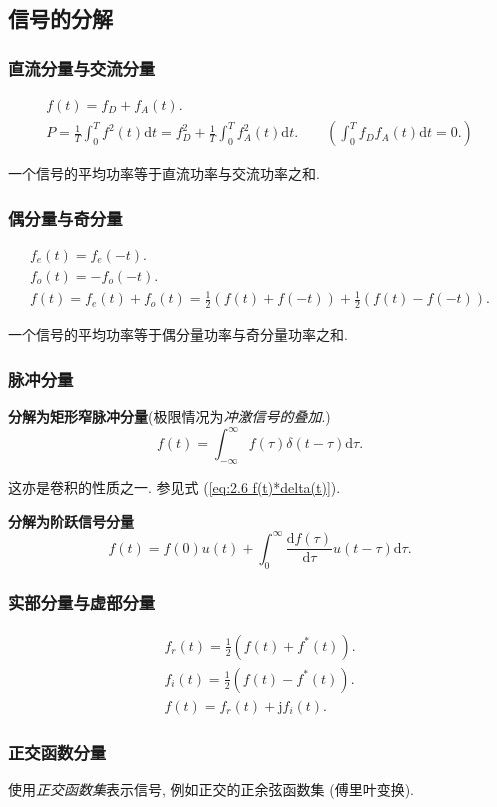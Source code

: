 \subsection{信号的分解}

\subsubsection{直流分量与交流分量}

\rmg
\begin{gather}
    f(t)=f_D+f_A(t). \\
    P=\frac{1}{T}\int_{0}^{T}f^2(t)\mathrm{d}t=f_D^2+\frac{1}{T}\int_{0}^{T}f_A^2(t)\mathrm{d}t.\qquad \left(\int_{0}^{T}f_Df_A(t)\mathrm{d}t=0.\right)
\end{gather}

一个信号的平均功率等于直流功率与交流功率之和.

\subsubsection{偶分量与奇分量}

\rmg
\begin{gather}
    f_e(t)=f_e(-t). \\
    f_o(t)=-f_o(-t). \\
    f(t)=f_e(t)+f_o(t)=\frac{1}{2}(f(t)+f(-t))+\frac{1}{2}(f(t)-f(-t)).
\end{gather}

一个信号的平均功率等于偶分量功率与奇分量功率之和.

\subsubsection{脉冲分量}

\textbf{分解为矩形窄脉冲分量}\quad (极限情况为\textit{冲激信号的叠加}.)
\begin{equation}
    f(t)=\int_{-\infty}^{\infty}f(\tau)\delta(t-\tau)\mathrm{d}\tau.
\end{equation}

这亦是卷积的性质之一. 参见式 (\ref{eq:2.6 f(t)*delta(t)}).

\textbf{分解为阶跃信号分量}
\begin{equation}
    f(t)=f(0)u(t)+\int_{0}^{\infty}\frac{\mathrm{d}f(\tau)}{\mathrm{d}\tau}u(t-\tau)\mathrm{d}\tau.
\end{equation}

\subsubsection{实部分量与虚部分量}

\rmg
\begin{gather}
    f_r(t)=\frac{1}{2}(f(t)+f^*(t)). \\
    f_i(t)=\frac{1}{2}(f(t)-f^*(t)). \\
    f(t)=f_r(t)+\mathrm{j}f_i(t).
\end{gather}

\subsubsection{正交函数分量}

使用\textit{正交函数集}表示信号, 例如正交的正余弦函数集 (傅里叶变换).
